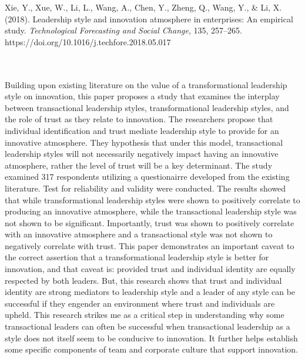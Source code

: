 \documentclass{apa7}
\begin{document}
\bigskip
\hfill\begin{minipage}{\dimexpr\textwidth-1in}
\begin{hangparas}{.25in}{1}
Xie, Y., Xue, W., Li, L., Wang, A., Chen, Y., Zheng, Q., Wang, Y., \& Li, X. (2018). Leadership style and innovation atmosphere in enterprises: An empirical study. \textit{Technological Forecasting and Social Change}, 135, 257–265. https://doi.org/10.1016/j.techfore.2018.05.017
\end{hangparas}
\xdef\tpd{\the\prevdepth}
\end{minipage}
\\
\\
Building upon existing literature on the value of a transformational leadership style on innovation, this paper proposes a study that examines the interplay between transactional leadership styles, transformational leadership styles, and the role of trust as they relate to innovation. The researchers propose that individual identification and trust mediate leadership style to provide for an innovative atmosphere. They hypothesis that under this model, transactional leadership styles will not necessarily negatively impact having an innovative atmosphere, rather the level of trust will be a key determinant. The study examined 317 respondents utilizing a questionairre developed from the existing literature. Test for reliability and validity were conducted. The results showed that while transformational leadership styles were shown to positively correlate to producing an innovative atmosphere, while the transactional leadership style was not shown to be significant. Importantly, trust was shown to positively correlate with an innovative atmosphere and a transactional style was not shown to negatively correlate with trust. This paper demonstrates an important caveat to the correct assertion that a transformational leadership style is better for innovation, and that caveat is: provided trust and individual identity are equally respected by both leaders. But, this research shows that trust and individual identity are strong mediators to leadership style and a leader of any style can be successful if they engender an environment where trust and individuals are upheld. This research strikes me as a critical step in understanding why some transactional leaders can often be successful when transactional leadership as a style does not itself seem to be conducive to innovation. It further helps establish some specific components of team and corporate culture that support innovation.
\end{document}
